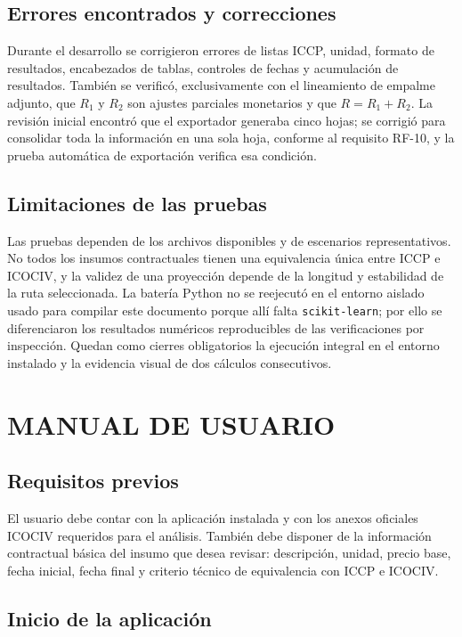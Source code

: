 \documentclass[12pt,letterpaper]{article}
\newcommand{\ICOCIV}{ICOCIV}
\newcommand{\ICCP}{ICCP}
\begin{document}
\subsection{Errores encontrados y correcciones}

Durante el desarrollo se corrigieron errores de listas \ICCP, unidad, formato de resultados, encabezados de tablas, controles de fechas y acumulación de resultados. También se verificó, exclusivamente con el lineamiento de empalme adjunto, que \(R_1\) y \(R_2\) son ajustes parciales monetarios y que \(R=R_1+R_2\). La revisión inicial encontró que el exportador generaba cinco hojas; se corrigió para consolidar toda la información en una sola hoja, conforme al requisito RF-10, y la prueba automática de exportación verifica esa condición.

\subsection{Limitaciones de las pruebas}

Las pruebas dependen de los archivos disponibles y de escenarios representativos. No todos los insumos contractuales tienen una equivalencia única entre \ICCP{} e \ICOCIV, y la validez de una proyección depende de la longitud y estabilidad de la ruta seleccionada. La batería Python no se reejecutó en el entorno aislado usado para compilar este documento porque allí falta \texttt{scikit-learn}; por ello se diferenciaron los resultados numéricos reproducibles de las verificaciones por inspección. Quedan como cierres obligatorios la ejecución integral en el entorno instalado y la evidencia visual de dos cálculos consecutivos.

\section{MANUAL DE USUARIO}

\subsection{Requisitos previos}

El usuario debe contar con la aplicación instalada y con los anexos oficiales \ICOCIV{} requeridos para el análisis. También debe disponer de la información contractual básica del insumo que desea revisar: descripción, unidad, precio base, fecha inicial, fecha final y criterio técnico de equivalencia con \ICCP{} e \ICOCIV.

\subsection{Inicio de la aplicación}
\end{document}
